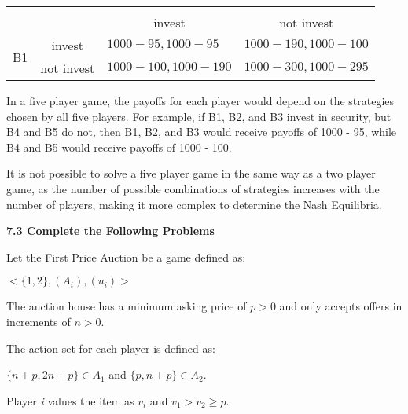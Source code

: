 \documentclass{homework}
\begin{document}
\begin{table}[h]
\begin{tabular}{llll}
                                           	&                       	& \multicolumn{2}{c}{}                                                                                  	\\ \cline{3-4}
                                           	& \multicolumn{1}{l|}{} 	& \multicolumn{1}{c|}{invest}                             	& \multicolumn{1}{c|}{not invest}                             	\\ \cline{2-4}
\multicolumn{1}{c|}{\multirow{2}{*}{B1}} & \multicolumn{1}{c|}{invest}  & \multicolumn{1}{l|}{$1000 - 95, 1000 - 95$}  & \multicolumn{1}{l|}{$1000 - 190, 1000 - 100$}  \\ \cline{2-4}
\multicolumn{1}{c|}{}                      	& \multicolumn{1}{c|}{not invest} & \multicolumn{1}{l|}{$1000 - 100, 1000 - 190$} & \multicolumn{1}{l|}{$1000 - 300, 1000 - 295$} \\ \cline{2-4}
\end{tabular}
\end{table}
In a five player game, the payoffs for each player would depend on the strategies chosen by all five players. For example, if B1, B2, and B3 invest in security, but B4 and B5 do not, then B1, B2, and B3 would receive payoffs of 1000 - 95, while B4 and B5 would receive payoffs of 1000 - 100.

It is not possible to solve a five player game in the same way as a two player game, as the number of possible combinations of strategies increases with the number of players, making it more complex to determine the Nash Equilibria.



\clearpage
\centerline{\Large\textbf{7.3 Complete the Following Problems}}

\exercise[18.2]
Let the First Price Auction be a game defined as:

\indent\hspace{18pt}$<\{1,2\},(A_{i}),(u_{i})>$

The auction house has a minimum asking price of $p > 0$ and only accepts offers in increments of $n > 0$. 

The action set for each player is defined as:

\indent\hspace{18pt}${\{n+p, 2n+p\}} \in A_{1}$ and ${\{p, n+p\}} \in A_{2}$. 

Player \emph{i} values the item as $v_{i}$ and $v_{1} > v_{2} \geq p$. 
\end{document}
